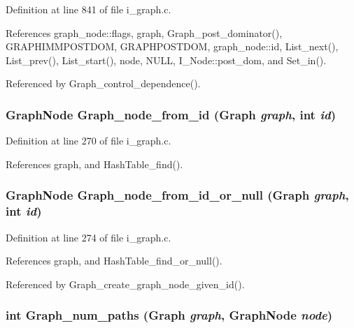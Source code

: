 Definition at line 841 of file i\_\-graph.c.

References graph\_\-node::flags, graph, Graph\_\-post\_\-dominator(), GRAPHIMMPOSTDOM, GRAPHPOSTDOM, graph\_\-node::id, List\_\-next(), List\_\-prev(), List\_\-start(), node, NULL, I\_\-Node::post\_\-dom, and Set\_\-in().

Referenced by Graph\_\-control\_\-dependence().
\subsubsection{\setlength{\rightskip}{0pt plus 5cm}\bf{Graph\-Node} Graph\_\-node\_\-from\_\-id (\bf{Graph} {\em graph}, int {\em id})}\label{i__graph_8h_fc757313a2a3d53b14f8254e8c85b374}




Definition at line 270 of file i\_\-graph.c.

References graph, and Hash\-Table\_\-find().
\subsubsection{\setlength{\rightskip}{0pt plus 5cm}\bf{Graph\-Node} Graph\_\-node\_\-from\_\-id\_\-or\_\-null (\bf{Graph} {\em graph}, int {\em id})}\label{i__graph_8h_4f7f8f49f25f26c840bf196158ddb599}




Definition at line 274 of file i\_\-graph.c.

References graph, and Hash\-Table\_\-find\_\-or\_\-null().

Referenced by Graph\_\-create\_\-graph\_\-node\_\-given\_\-id().
\subsubsection{\setlength{\rightskip}{0pt plus 5cm}int Graph\_\-num\_\-paths (\bf{Graph} {\em graph}, \bf{Graph\-Node} {\em node})}\label{i__graph_8h_a20b61b3ec892bc520b1fd02aaddff17}


